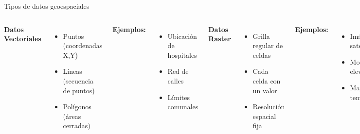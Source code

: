 \documentclass[10pt]{beamer}
\begin{document}
\begin{frame}{Tipos de datos geoespaciales}
    \begin{columns}
        \textbf{Datos Vectoriales}
        \begin{itemize}
            \item \textcolor{blue}{} Puntos (coordenadas X,Y)
            \item \textcolor{green}{} Líneas (secuencia de puntos)
            \item \textcolor{red}{} Polígonos (áreas cerradas)
        \end{itemize}
        
        \vspace{0.3cm}
        \textbf{Ejemplos:}
        \begin{itemize}
            \item Ubicación de hospitales
            \item Red de calles
            \item Límites comunales
        \end{itemize}
        
        \textbf{Datos Raster}
        \begin{itemize}
            \item Grilla regular de celdas
            \item Cada celda con un valor
            \item Resolución espacial fija
        \end{itemize}
        
        \vspace{0.3cm}
        \textbf{Ejemplos:}
        \begin{itemize}
            \item Imágenes satelitales
            \item Modelos de elevación
            \item Mapas de temperatura
        \end{itemize}
    \end{columns}
    
    \vspace{0.3cm}
    \begin{center}
    \end{center}
\end{frame}
\end{document}
